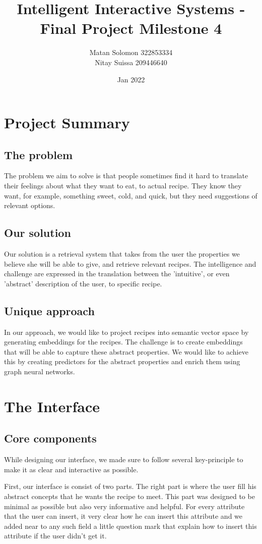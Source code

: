 \documentclass[]{article}
\title{\vspace{-2cm}Intelligent Interactive Systems - Final Project Milestone 4}
\author{Matan Solomon 322853334 \\ Nitay Suissa 209446640}
\date{Jan 2022}
\begin{document}
\maketitle
\section{Project Summary}
\subsection{The problem}
The problem we aim to solve is that people sometimes find it hard to translate their feelings about what they want to eat, to actual recipe. They know they want, for example, something sweet, cold, and quick, but they need suggestions of relevant options.
\subsection{Our solution}
Our solution is a retrieval system that takes from the user the properties we believe she will be able to give, and retrieve relevant recipes. The intelligence and challenge are expressed in the translation between the 'intuitive', or even 'abstract' description of the user, to specific recipe.
\subsection{Unique approach}
In our approach, we would like to project recipes into semantic vector space by generating embeddings for the recipes. The challenge is to create embeddings that will be able to capture these abstract properties. We would like to achieve this by creating predictors for the abstract properties and enrich them using graph neural networks. 

\section{The Interface}

\subsection{Core components}
While designing our interface, we made sure to follow several key-principle to make it as clear and interactive as possible.

First, our interface is consist of two parts. The right part is where the user fill his abstract concepts that he wants the recipe to meet. This part was designed to be minimal as possible but also very informative and helpful. For every attribute that the user can insert, it very clear how he can insert this attribute and we added near to any such field a little question mark that explain how to insert this attribute if the user didn't get it.
\end{document}
